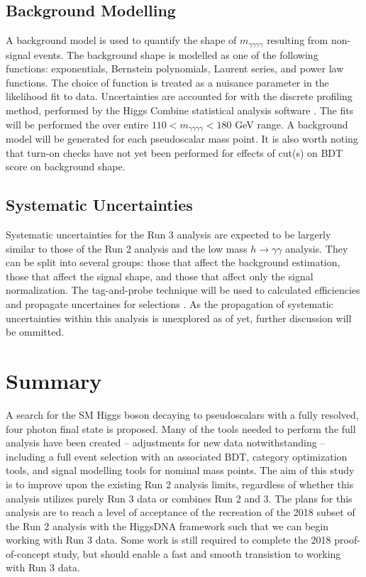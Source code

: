 \documentclass[12pt]{article}
\begin{document}
\subsection{Background Modelling}
A background model is used to quantify the shape of $m_{\gamma\gamma\gamma\gamma}$ resulting from non-signal events. The background shape is modelled as one of the following functions: exponentials, Bernstein polynomials, Laurent series, and power law functions. The choice of function is treated as a nuisance parameter in the likelihood fit to data. Uncertainties are accounted for with the discrete profiling method, performed by the Higgs Combine statistical analysis software \cite{discrete-profiling, higgs-combine}. The fits will be performed the over entire $110 < m_{\gamma\gamma\gamma\gamma} < 180$ GeV range. A background model will be generated for each pseudoscalar mass point. It is also worth noting that turn-on checks have not yet been performed for effects of cut(s) on BDT score on background shape.\par

\subsection{Systematic Uncertainties}
Systematic uncertainties for the Run 3 analysis are expected to be largerly similar to those of the Run 2 analysis and the low mass $h\rightarrow \gamma\gamma$ analysis. They can be split into several groups: those that affect the background estimation, those that affect the signal shape, and those that affect only the signal normalization. The tag-and-probe technique will be used to calculated efficiencies and propagate uncertaines for selections \cite{Chatrchyan2011}. As the propagation of systematic uncertainties within this analysis is unexplored as of yet, further discussion will be ommitted.\par


\section{Summary}
A search for the SM Higgs boson decaying to pseudoscalars with a fully resolved, four photon final state is proposed. Many of the tools needed to perform the full analysis have been created -- adjustments for new data notwithstanding -- including a full event selection with an associated BDT, category optimization tools, and signal modelling tools for nominal mass points. The aim of this study is to improve upon the existing Run 2 analysis limits, regardless of whether this analysis utilizes purely Run 3 data or combines Run 2 and 3. The plans for this analysis are to reach a level of acceptance of the recreation of the 2018 subset of the Run 2 analysis with the HiggsDNA framework such that we can begin working with Run 3 data. Some work is still required to complete the 2018 proof-of-concept study, but should enable a fast and smooth transistion to working with Run 3 data.\par

\newpage
\printbibliography
\end{document}
